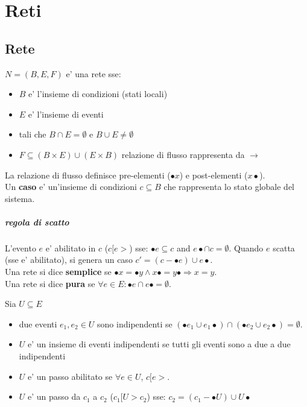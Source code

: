 \chapter{Reti}

\section{Rete}

$N = (B, E, F)$ e' una rete sse:
\begin{itemize}
  \item $B$ e' l'insieme di condizioni (stati locali)
  \item $E$ e' l'insieme di eventi
  \item tali che $B \cap E = \emptyset$ e $B \cup E \neq \emptyset$
  \item $F \subseteq (B \times E) \cup (E \times B)$ relazione di flusso rappresenta da $\rightarrow$
\end{itemize}

La relazione di flusso definisce pre-elementi ($\bullet x$) e post-elementi ($x \bullet$). \\

Un \textbf{caso} e' un'insieme di condizioni $c \subseteq B$ che rappresenta lo stato globale del sistema.

\paragraph{regola di scatto}

L'evento $e$ e' abilitato in $c$ ($c[e>$) sse: $\bullet e \subseteq c$ and $e \bullet \cap c = \emptyset$.
Quando $e$ scatta (sse e' abilitato), si genera un caso $c' = (c - \bullet e) \cup e \bullet$. \\

Una rete si dice \textbf{semplice} se $\bullet x = \bullet y \land x \bullet = y \bullet \Rightarrow x = y$.\\

Una rete si dice \textbf{pura} se $\forall e \in E : \bullet e \cap e \bullet = \emptyset$.

Sia $U \subseteq E$
\begin{itemize}
  \item due eventi $e_1,e_2 \in U$ sono indipendenti se $(\bullet e_1 \cup e_1 \bullet) \cap (\bullet e_2 \cup e_2 \bullet) = \emptyset$.
  \item $U$ e' un insieme di eventi indipendenti se tutti gli eventi sono a due a due indipendenti
  \item $U$ e' un passo abilitato se $\forall e \in U$, $c[e>$.
  \item $U$ e' un passo da $c_1$ a $c_2$ ($c_1[U>c_2$) sse: $c_2 = (c_1 - \bullet U) \cup U \bullet$
\end{itemize}

